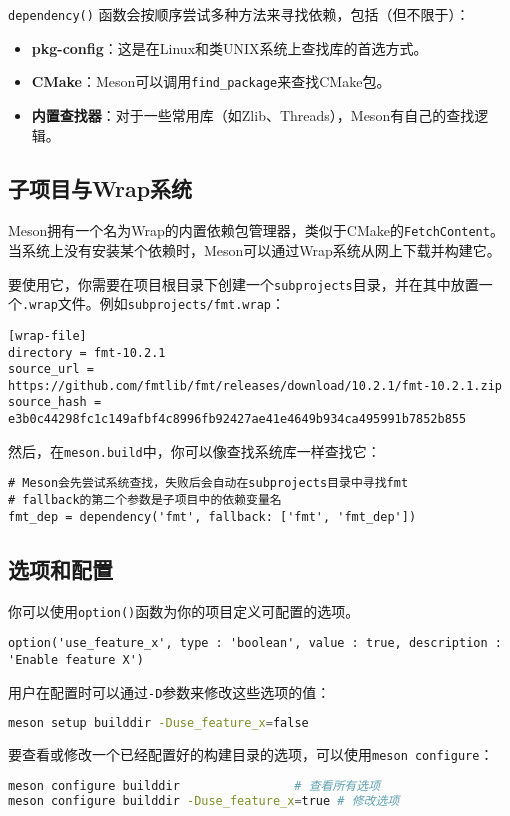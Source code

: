 \texttt{dependency()} 函数会按顺序尝试多种方法来寻找依赖，包括（但不限于）：
\begin{itemize}
  \item \textbf{pkg-config}：这是在Linux和类UNIX系统上查找库的首选方式。
  \item \textbf{CMake}：Meson可以调用\texttt{find\_package}来查找CMake包。
  \item \textbf{内置查找器}：对于一些常用库（如Zlib、Threads），Meson有自己的查找逻辑。
\end{itemize}

\subsection{子项目与Wrap系统}
Meson拥有一个名为Wrap的内置依赖包管理器，类似于CMake的\texttt{FetchContent}。当系统上没有安装某个依赖时，Meson可以通过Wrap系统从网上下载并构建它。

要使用它，你需要在项目根目录下创建一个\texttt{subprojects}目录，并在其中放置一个\texttt{.wrap}文件。例如\texttt{subprojects/fmt.wrap}：
\begin{lstlisting}
[wrap-file]
directory = fmt-10.2.1
source_url = https://github.com/fmtlib/fmt/releases/download/10.2.1/fmt-10.2.1.zip
source_hash = e3b0c44298fc1c149afbf4c8996fb92427ae41e4649b934ca495991b7852b855
\end{lstlisting}
然后，在\texttt{meson.build}中，你可以像查找系统库一样查找它：
\begin{lstlisting}
# Meson会先尝试系统查找，失败后会自动在subprojects目录中寻找fmt
# fallback的第二个参数是子项目中的依赖变量名
fmt_dep = dependency('fmt', fallback: ['fmt', 'fmt_dep'])
\end{lstlisting}

\subsection{选项和配置}
你可以使用\texttt{option()}函数为你的项目定义可配置的选项。
\begin{lstlisting}
option('use_feature_x', type : 'boolean', value : true, description : 'Enable feature X')
\end{lstlisting}
用户在配置时可以通过\texttt{-D}参数来修改这些选项的值：
\begin{lstlisting}[language=bash]
meson setup builddir -Duse_feature_x=false
\end{lstlisting}
要查看或修改一个已经配置好的构建目录的选项，可以使用\texttt{meson configure}：
\begin{lstlisting}[language=bash]
meson configure builddir                # 查看所有选项
meson configure builddir -Duse_feature_x=true # 修改选项
\end{lstlisting}

